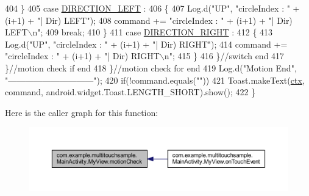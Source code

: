 \begin{DoxyCode}
404                         \}
405                         \textcolor{keywordflow}{case} \hyperlink{classcom_1_1example_1_1multitouchsample_1_1_main_activity_1_1_my_view_aad2a71c46e7cad809a27eb9c4c2600d9}{DIRECTION\_LEFT} :
406                         \{
407                             Log.d(\textcolor{stringliteral}{"UP"}, \textcolor{stringliteral}{"circleIndex : "} + (i+1) + \textcolor{stringliteral}{"| Dir) LEFT"});
408                             command += \textcolor{stringliteral}{"circleIndex : "} + (i+1) + \textcolor{stringliteral}{"| Dir) LEFT\(\backslash\)n"};
409                             \textcolor{keywordflow}{break};
410                         \}
411                         \textcolor{keywordflow}{case} \hyperlink{classcom_1_1example_1_1multitouchsample_1_1_main_activity_1_1_my_view_a2d1dd293bf4c64feec7de128ef21739e}{DIRECTION\_RIGHT} :
412                         \{
413                             Log.d(\textcolor{stringliteral}{"UP"}, \textcolor{stringliteral}{"circleIndex : "} + (i+1) + \textcolor{stringliteral}{"| Dir) RIGHT"});
414                             command += \textcolor{stringliteral}{"circleIndex : "} + (i+1) + \textcolor{stringliteral}{"| Dir) RIGHT\(\backslash\)n"};
415                         \}
416                     \}\textcolor{comment}{//switch end}
417                 \}\textcolor{comment}{//motion check if end}
418             \}\textcolor{comment}{//motion check for end}
419             Log.d(\textcolor{stringliteral}{"Motion End"}, \textcolor{stringliteral}{"------------------------------"});
420             \textcolor{keywordflow}{if}(!command.equals(\textcolor{stringliteral}{""}))
421                 Toast.makeText(\hyperlink{classcom_1_1example_1_1multitouchsample_1_1_main_activity_a55ac0e8368b828f2e73446810af25a24}{ctx}, command, android.widget.Toast.LENGTH\_SHORT).show();
422         \}
\end{DoxyCode}


Here is the caller graph for this function\+:
\nopagebreak
\begin{figure}[H]
\begin{center}
\leavevmode
\includegraphics[width=350pt]{classcom_1_1example_1_1multitouchsample_1_1_main_activity_1_1_my_view_aee59904e43e35df3dd7684f22b7dc65d_icgraph}
\end{center}
\end{figure}


